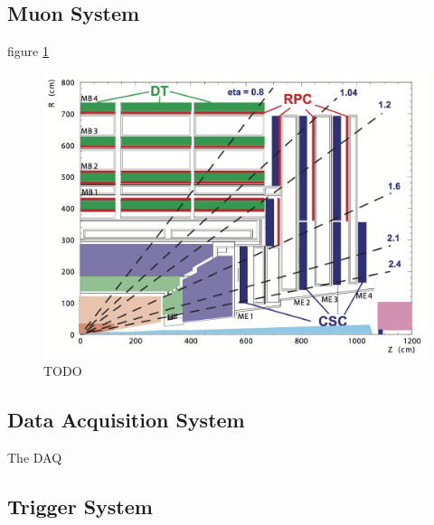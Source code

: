 \subsection{Muon System}
\label{SUBSECTION:ExperimentalApparatus_CMS_Moun}

figure \ref{FIGURE:ExperimentalApparatus_CMS_Muon_Layout}

\begin{figure}[!htb]
  \centering
  \includegraphics{Chapter02/CMS/Images/CMS_Muon_Layout.png}
  \caption{TODO}
  \label{FIGURE:ExperimentalApparatus_CMS_Muon_Layout}
\end{figure}

\subsection{Data Acquisition System}
\label{SUBSECTION:ExperimentalApparatus_CMS_DAQ}

The \gls{DAQ}

\subsection{Trigger System}
\label{SUBSECTION:ExperimentalApparatus_CMS_Trigger}

